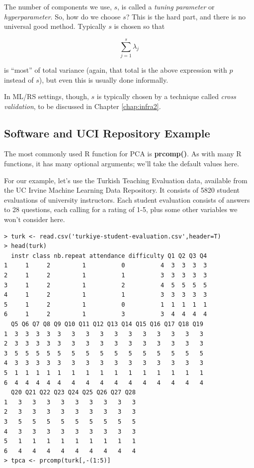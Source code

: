 The number of components we use, $s$, is called a \textit{tuning
parameter} or \textit{hyperparameter}.  So, how do we choose $s$?  This
is the hard part, and there is no universal good method.  Typically $s$
is chosen so that 

\begin{equation} 
\sum_{j=1}^s \lambda_j
\end{equation}

is ``most'' of total variance (again, that total is the above expression
with $p$ instead of $s$), but even this is usually done informally.

In ML/RS settings, though, $s$ is typically chosen by a technique called
\textit{cross validation}, to be discussed in Chapter \ref{chap:infra2}.

\subsection{Software and UCI Repository Example}

The most commonly used R function for PCA is \textbf{prcomp()}.  As with
many R functions, it has many optional arguments; we'll take the default
values here.

For our example, let's use the Turkish Teaching Evaluation data,
available from the UC Irvine Machine Learning Data Repository.  It
consists of 5820 student evaluations of university instructors.  Each
student evaluation consists of answers to 28 questions, each calling for
a rating of 1-5, plus some other variables we won't consider here.

\begin{lstlisting}
> turk <- read.csv('turkiye-student-evaluation.csv',header=T)
> head(turk)
  instr class nb.repeat attendance difficulty Q1 Q2 Q3 Q4
1     1     2         1          0          4  3  3  3  3
2     1     2         1          1          3  3  3  3  3
3     1     2         1          2          4  5  5  5  5
4     1     2         1          1          3  3  3  3  3
5     1     2         1          0          1  1  1  1  1
6     1     2         1          3          3  4  4  4  4
  Q5 Q6 Q7 Q8 Q9 Q10 Q11 Q12 Q13 Q14 Q15 Q16 Q17 Q18 Q19
1  3  3  3  3  3   3   3   3   3   3   3   3   3   3   3
2  3  3  3  3  3   3   3   3   3   3   3   3   3   3   3
3  5  5  5  5  5   5   5   5   5   5   5   5   5   5   5
4  3  3  3  3  3   3   3   3   3   3   3   3   3   3   3
5  1  1  1  1  1   1   1   1   1   1   1   1   1   1   1
6  4  4  4  4  4   4   4   4   4   4   4   4   4   4   4
  Q20 Q21 Q22 Q23 Q24 Q25 Q26 Q27 Q28
1   3   3   3   3   3   3   3   3   3
2   3   3   3   3   3   3   3   3   3
3   5   5   5   5   5   5   5   5   5
4   3   3   3   3   3   3   3   3   3
5   1   1   1   1   1   1   1   1   1
6   4   4   4   4   4   4   4   4   4
> tpca <- prcomp(turk[,-(1:5)]
\end{lstlisting}

